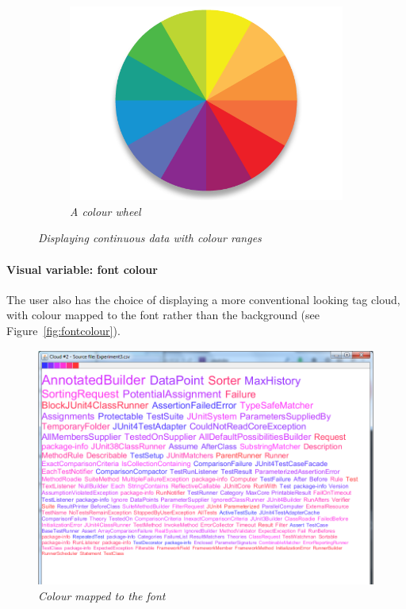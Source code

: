 \begin{figure}[!htb]
\begin{subfigure}{\textwidth}
  \includegraphics[scale=0.40]{colour_wheel.png}
  \caption{\textit{A colour wheel}}
\end{subfigure}
  \caption{\textit{Displaying continuous data with colour ranges}}
  \label{fig:continuous}
\end{figure}

\paragraph{Visual variable: font colour} The user also has the choice of displaying a more conventional looking tag cloud, with colour mapped to the font rather than the background (see Figure~\vref{fig:fontcolour}).

\begin{figure}[!htb]
  	\centering
   	\includegraphics[scale=0.35]{fontcolour.png}
  	\caption{\textit{Colour mapped to the font}}
	\label{fig:fontcolour}
\end{figure}

